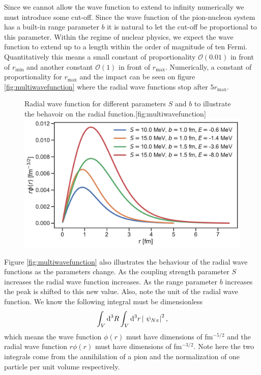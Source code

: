 Since we cannot allow the wave function to extend to infinity numerically we must introduce some cut-off. Since the wave function of the pion-nucleon system has a built-in range parameter $b$ it is natural to let the cut-off be proportional to this parameter.
Within the regime of nuclear physics, we expect the wave function to extend up to a length within the order of magnitude of ten Fermi. Quantitatively this means a small constant of proportionality $\mathcal{O}(0.01)$ in front of $r_\text{min}$ and another constant $\mathcal{O}(1)$ in front of $r_{\text{max}}$. Numerically, a constant of proportionality for $r_{\text{max}}$ and the impact can be seen on figure \ref{fig:multiwavefunction} where the radial wave functions stop after $5r_\text{max}$.
\begin{figure}[H]
	\begin{sidecaption}{Radial wave function for different parameters $S$ and $b$ to illustrate the behavoir on the radial function.}[fig:multiwavefunction]
		\includegraphics[width=\linewidth]{Figures/multiwavefunction.pdf}
	\end{sidecaption}
\end{figure} 
Figure \ref{fig:multiwavefunction} also illustrates the behaviour of the radial wave functions as the parameters change. As the coupling strength parameter $S$ increases the radial wave function increases. As the range parameter $b$ increases the peak is shifted to this new value. Also, note the unit of the radial wave function. We know the following integral must be dimensionless 
\begin{equation} \label{key}
	\int_V \text{d}^3R \int_V \text{d}^3r \, \abs{ \psi_{N\pi}}^2,
\end{equation}
which means the wave function $\phi(r)$ must have dimensions of fm$^{-5/2}$ and the radial wave function $r\phi(r)$ must have dimensions of fm$^{-3/2}$. Note here the two integrals come from the annihilation of a pion and the normalization of one particle per unit volume respectively.


